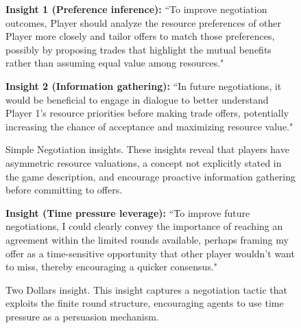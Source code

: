 \begin{figure}[H]
\centering
\begin{tcolorbox}[
    colback=blue!5!white,
    colframe=blue!40!white,
    left=1mm, right=1mm, top=1mm, bottom=1mm,
    width=\textwidth,
    enhanced,
    attach boxed title to top center={yshift=-2mm},
    boxed title style={colback=blue!40!white},
    title={Simple Negotiation Insights},
    label=box:simple_neg_insights
]

\textbf{Insight 1 (Preference inference):}
``To improve negotiation outcomes, Player should analyze the resource preferences of other Player more closely and tailor offers to match those preferences, possibly by proposing trades that highlight the mutual benefits rather than assuming equal value among resources."

\textbf{Insight 2 (Information gathering):}
``In future negotiations, it would be beneficial to engage in dialogue to better understand Player 1's resource priorities before making trade offers, potentially increasing the chance of acceptance and maximizing resource value."

\end{tcolorbox}
\caption{Simple Negotiation insights. These insights reveal that players have asymmetric resource valuations, a concept not explicitly stated in the game description, and encourage proactive information gathering before committing to offers.}
\label{box:simple_neg_insights}
\end{figure}

\begin{figure}[H]
\centering
\begin{tcolorbox}[
    colback=blue!5!white,
    colframe=blue!40!white,
    left=1mm, right=1mm, top=1mm, bottom=1mm,
    width=\textwidth,
    enhanced,
    attach boxed title to top center={yshift=-2mm},
    boxed title style={colback=blue!40!white},
    title={Two Dollars Negotiation Insight},
    label=box:two_dollars_insight
]

\textbf{Insight (Time pressure leverage):}
``To improve future negotiations, I could clearly convey the importance of reaching an agreement within the limited rounds available, perhaps framing my offer as a time-sensitive opportunity that other player wouldn't want to miss, thereby encouraging a quicker consensus."

\end{tcolorbox}
\caption{Two Dollars insight. This insight captures a negotiation tactic that exploits the finite round structure, encouraging agents to use time pressure as a persuasion mechanism.}
\label{box:two_dollars_insight}
\end{figure}

